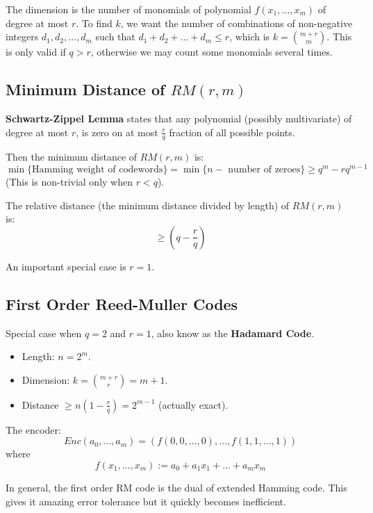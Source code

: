 \documentclass[11pt]{article}
\begin{document}
The dimension is the number of monomials of polynomial $f(x_1, \ldots, x_m)$ of degree at most $r$.
To find $k$, we want the number of combinations of non-negative integers $d_1, d_2, \ldots, d_m$ such that $d_1 + d_2 + \ldots + d_m \leq r$, which is $k = \binom{m + r}{m}$.
This is only valid if $q > r$, otherwise we may count some monomials several times.

\subsection{Minimum Distance of $RM(r, m)$}
\textbf{Schwartz-Zippel Lemma} states that any polynomial (possibly multivariate) of degree at most $r$, is zero on at most $\frac{r}{q}$ fraction of all possible points.

Then the minimum distance of $RM(r, m)$ is:
\[
  \min \{ \text{Hamming weight of codewords}\} = \min \{ n - \text{ number of zeroes}\} \geq q^m - rq^{m-1}
\]
(This is non-trivial only when $r < q$).

The relative distance (the minimum distance divided by length) of $RM(r, m)$ is:
\[
  \geq (q - \frac{r}{q})
\]

An important special case is $r = 1$.

\subsection{First Order Reed-Muller Codes}
Special case when $q = 2$ and $r = 1$, also know as the \textbf{Hadamard Code}.
\begin{itemize}
  \item Length: $n = 2^m$.
  \item Dimension: $k = \binom{m + r}{r} = m + 1$.
  \item Distance $\geq n\left(1 - \frac{r}{q}\right) = 2^{m - 1}$ (actually exact).
\end{itemize}

The encoder:
\[
  Enc(a_0, \ldots, a_m) = (f(0, 0, \ldots, 0), \ldots, f(1, 1, \ldots, 1))
\]
where
\[
  f(x_1, \ldots, x_m) := a_0 + a_1x_1 + \ldots + a_mx_m
\]

In general, the first order RM code is the dual of extended Hamming code.
This gives it amazing error tolerance but it quickly becomes inefficient.
\end{document}
